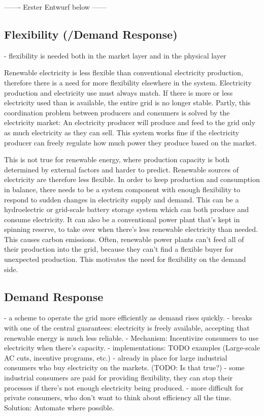 ------- Erster Entwurf below ------

\subsection{Flexibility (/Demand Response)}


- flexibility is needed both in the market layer and in the physical layer

Renewable electricity is less flexible than conventional electricity production, therefore there is a need for more flexibility elsewhere in the system.
Electricity production and electricity use must always match. If there is more or less electricity used than is available, the entire grid is no longer stable.
Partly, this coordination problem between producers and consumers is solved by the electricity market:
An electricity producer will produce and feed to the grid only as much electricity as they can sell.
This system works fine if the electricity producer can freely regulate how much power they produce based on the market.

This is not true for renewable energy, where production capacity is both determined by external factors and harder to predict.
Renewable sources of electricity are therefore less flexible.
In order to keep production and consumption in balance, there needs to be a system component with enough flexibility to respond to sudden changes in electricity supply and demand.
This can be a hydroelectric or grid-scale battery storage system which can both produce and consume electricity.
It can also be a conventional power plant that's kept in spinning reserve, to take over when there's less renewable electricity than needed. This causes carbon emissions.
Often, renewable power plants can't feed all of their production into the grid, because they can't find a flexible buyer for unexpected production.
This motivates the need for flexibility on the demand side.



\subsection{Demand Response}
- a scheme to operate the grid more efficiently as demand rises quickly.
- breaks with one of the central guarantees: electricity is freely available, accepting that renewable energy is much less reliable.
- Mechanism: Incentivize consumers to use electricity when there's capacity.
- implementations: TODO examples (Large-scale AC cuts, incentive programs, etc.)
- already in place for large industrial consumers who buy electricity on the markets. (TODO: Is that true?)
    - some industrial consumers are paid for providing flexibility, they can stop their processes if there's not enough electricity being produced.
- more difficult for private consumers, who don't want to think about efficiency all the time. Solution: Automate where possible.


